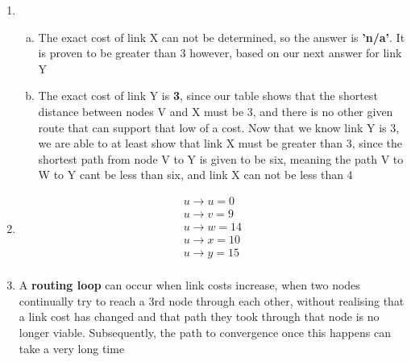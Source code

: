 \documentclass[14pt]{article}
\newcommand{\bd}{\textbf}
\begin{document}
\begin{enumerate}
\item
\begin{enumerate}[(a)]
\item
The exact cost of link X can not be determined, so the answer is \bd{'n/a'}. It is proven to be greater than 3 however, based on our next answer for link Y \\

\item
The exact cost of link Y is \bd{3}, since our table shows that the shortest distance between nodes V and X must be 3, and there is no other given route that can support that low of a cost. Now that we know link Y is 3, we are able to at least show that link X must be greater than 3, since the shortest path from node V to Y is given to be six, meaning the path V to W to Y cant be less than six, and link X can not be less than 4

\end{enumerate}

\item
\begin{equation*}
\begin{aligned}
u \rightarrow u = 0 \\
u \rightarrow v = 9 \\
u \rightarrow w = 14 \\
u \rightarrow x = 10 \\
u \rightarrow y = 15 \\
\end{aligned}
\end{equation*}

\item
A \bd{routing loop} can occur when link costs increase, when two nodes continually try to reach a 3rd node through each other, without realising that a link cost has changed and that path they took through that node is no longer viable. Subsequently, the path to convergence once this happens can take a very long time

\end{enumerate}
\end{document}
